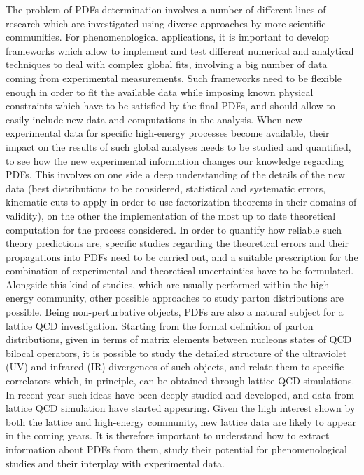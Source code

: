 The problem of PDFs determination involves a number of different lines of research which are investigated 
using diverse approaches by more scientific communities.
%
For phenomenological applications, it is important to develop frameworks which allow to implement and test
different numerical and analytical techniques to deal with complex global fits, involving a big number of data coming
from experimental measurements. Such frameworks need to be flexible enough in order to fit the available data 
while imposing known physical constraints which have to be satisfied by the final PDFs,
and should allow to easily include new data and computations in the analysis. 
%
When new experimental data for specific high-energy processes become available,
their impact on the results of such global analyses needs to be studied and quantified, to see how the new experimental 
information changes our knowledge regarding PDFs.
This involves on one side a deep understanding of the details of the new data (best distributions to be considered,
statistical and systematic errors, kinematic cuts to apply in order to use factorization theorems in their domains of validity), 
on the other the implementation of the most up to date theoretical computation for the process considered.  
%
In order to quantify how reliable such theory predictions are, specific studies regarding the theoretical errors
and their propagations into PDFs need to be carried out, and a suitable prescription for the combination
of experimental and theoretical uncertainties have to be formulated.
%
Alongside this kind of studies, which are usually performed within the high-energy community,
other possible approaches to study parton distributions are possible.
Being non-perturbative objects, PDFs are also a natural subject for a lattice QCD investigation. 
Starting from the formal definition of parton distributions, given in terms of matrix elements between 
nucleons states of QCD bilocal operators, it is possible to study the detailed structure of the ultraviolet (UV)
and infrared (IR) divergences of such objects, and relate them to specific correlators which, in principle, 
can be obtained through lattice QCD simulations. In recent year such ideas have been deeply studied and developed, 
and data from lattice QCD simulation have started appearing. 
Given the high interest shown by both the lattice and high-energy community, new lattice data are likely to appear
in the coming years. It is therefore important to understand how
to extract information about PDFs from them, study their potential for phenomenological studies and
their interplay with experimental data.

